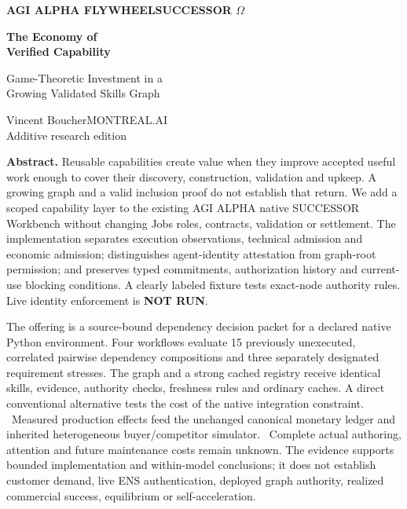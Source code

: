 \documentclass[11pt,a4paper]{article}
\begin{document}
\thispagestyle{empty}
{\sffamily\bfseries\color{AlphaPurple}\large AGI ALPHA FLYWHEEL\hfill SUCCESSOR $\Omega$\par}
\vspace{10mm}
{\sffamily\bfseries\color{AlphaInk}\fontsize{29}{33}\selectfont The Economy of\\Verified Capability\par}
\vspace{4mm}
{\sffamily\color{AlphaPurple}\Large Game-Theoretic Investment in a\\Growing Validated Skills Graph\par}
\vspace{6mm}
{\large Vincent Boucher}\hfill{\sffamily MONTREAL.AI}\\
{\small\color{AlphaGray}\ReportDate\quad\textbullet\quad Additive research edition\quad\textbullet\quad\ReportState}
\vspace{5mm}

\textbf{Abstract.}
Reusable capabilities create value when they improve accepted useful work enough to cover their discovery, construction, validation and upkeep. A growing graph and a valid inclusion proof do not establish that return. We add a scoped capability layer to the existing AGI ALPHA native SUCCESSOR Workbench without changing Jobs roles, contracts, validation or settlement. The implementation separates execution observations, technical admission and economic admission; distinguishes agent-identity attestation from graph-root permission; and preserves typed commitments, authorization history and current-use blocking conditions. A clearly labeled fixture tests exact-node authority rules. Live identity enforcement is \textbf{NOT RUN}.

The offering is a source-bound dependency decision packet for a declared native Python environment. Four workflows evaluate 15 previously unexecuted, correlated pairwise dependency compositions and three separately designated requirement stresses. The graph and a strong cached registry receive identical skills, evidence, authority checks, freshness rules and ordinary caches. A direct conventional alternative tests the cost of the native integration constraint. \AbstractProductionResult\ Measured production effects feed the unchanged canonical monetary ledger and inherited heterogeneous buyer/competitor simulator. \AbstractMarketResult\ Complete actual authoring, attention and future maintenance costs remain unknown. The evidence supports bounded implementation and within-model conclusions; it does not establish customer demand, live ENS authentication, deployed graph authority, realized commercial success, equilibrium or self-acceleration.
\end{document}
